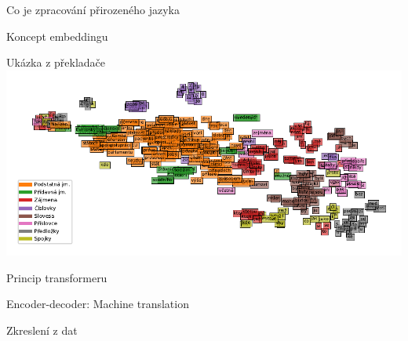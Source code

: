\documentclass[aspectratio=169,dvipsnames,handout]{beamer}
\begin{document}

\begin{frame}{Co je zpracování přirozeného jazyka}
\end{frame}


\begin{frame}{Koncept embeddingu}
\end{frame}


\begin{frame}{Ukázka z překladače}
    \hspace*{-10pt}\includegraphics{./plots/tsne.pdf}
\end{frame}


\begin{frame}{Princip transformeru}
    
\end{frame}


\begin{frame}{Encoder-decoder: Machine translation}
\end{frame}

\begin{frame}{Zkreslení z dat}
\end{frame}

\end{document}
